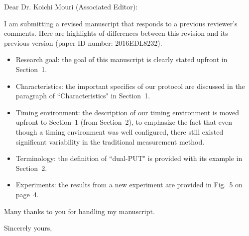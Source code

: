 \documentclass{letter} %
\begin{document}
\begin{letter}
\vspace{0.5in}
 
\opening{Dear Dr. Koichi Mouri (Associated Editor):} 
 
\noindent 

I am submitting a revised manuscript that responds to a previous reviewer's comments. 
Here are highlights of differences between this revision and its previous version (paper ID number: 2016EDL8232).

\begin{itemize}

\item Research goal: the goal of this manuscript is clearly stated upfront in Section~1. 

\item Characteristics: the important specifics of our protocol are discussed 
in the paragraph of ``Characteristics" in Section~1. 

\item Timing environment: the description of our timing environment 
is moved upfront to Section~1 (from Section~2), 
to emphasize the fact that even though a timing environment was well configured, 
there still existed significant variability in the traditional measurement method.

\item Terminology: the definition of ``dual-PUT" is provided with its example in Section~2. 

\item Experiments: the results from a new experiment are provided in Fig.~5 on page~4.

\end{itemize} 

Many thanks to you for handling my manuscript.

\closing{Sincerely yours,} 

\end{letter}
 
\end{document}
